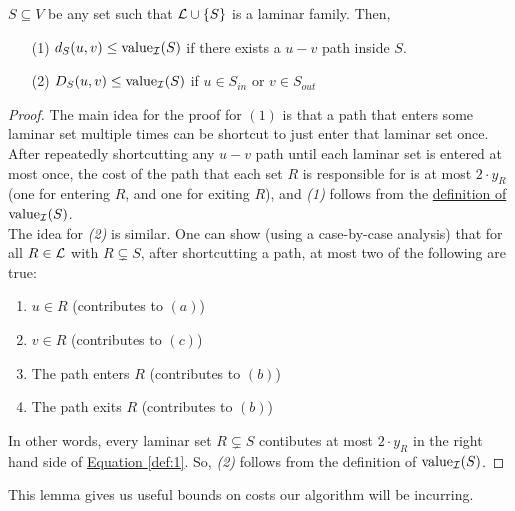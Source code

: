 	\begin{lemma}\label{lemm:2:D-val}
		$S\subseteq V$ be any set such that $\mathcal{L} \cup \{S\}$ is a laminar family.
		Then,
		\begin{enumerate}
			\item[(1)] $d_S(u,v)\leq \textup{value}_{\mathcal{I}}(S)$ if there exists a $u-v$ path inside $S$.
			\item[(2)] $D_S(u,v)\leq \textup{value}_{\mathcal{I}}(S)$ if $u\in S_{in}$ or $v\in S_{out}$
		\end{enumerate}
	\end{lemma}
	\begin{proof}
		The main idea for the proof for $(1)$ is that a path that enters some laminar set multiple times can be shortcut to just enter that laminar set once.
		After repeatedly shortcutting any $u-v$ path until each laminar set is entered at most once, the cost of the path that each set $R$ is responsible for is at most $2\cdot y_R$ (one for entering $R$, and one for exiting $R$), and \textit{(1)} follows from the \hyperref[def:value]{definition of $\textup{value}_{\mathcal{I}}(S)$}.\\
		The idea for \textit{(2)} is similar. One can show (using a case-by-case analysis) that for all $R\in \mathcal{L}$ with $R\subsetneq S$, after shortcutting a path, at most two of the following are true:
		\begin{enumerate}
			\item $u\in R$ (contributes to $(a)$)
			\item $v\in R$ (contributes to $(c)$)
			\item The path enters $R$ (contributes to $(b)$)
			\item The path exits $R$ (contributes to $(b)$)
		\end{enumerate}
		In other words, every laminar set $R\subsetneq S$ contibutes at most $2\cdot y_R$ in the right hand side of \hyperref[def:1]{Equation \ref{def:1}}. So, \textit{(2)} follows from the definition of $\textup{value}_{\mathcal{I}}(S)$.
	\end{proof}

	This lemma gives us useful bounds on costs our algorithm will be incurring.

